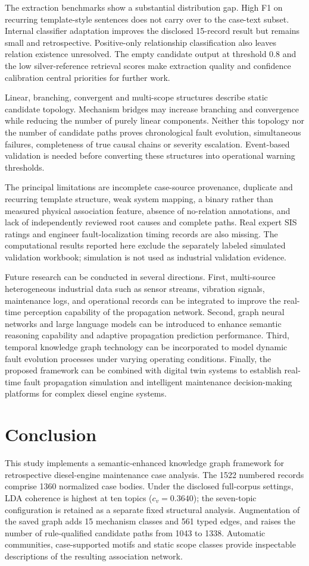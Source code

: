 \documentclass[
aps,%
12pt,%
final,%
notitlepage,%
oneside,%
onecolumn,%
nobibnotes,%
nofootinbib,%
superscriptaddress,%
noshowpacs,%
centertags]%
{revtex4}
\begin{document}
The extraction benchmarks show a substantial distribution gap. High F1 on recurring template-style sentences does not carry over to the case-text subset. Internal classifier adaptation improves the disclosed 15-record result but remains small and retrospective. Positive-only relationship classification also leaves relation existence unresolved. The empty candidate output at threshold 0.8 and the low silver-reference retrieval scores make extraction quality and confidence calibration central priorities for further work.

Linear, branching, convergent and multi-scope structures describe static candidate topology. Mechanism bridges may increase branching and convergence while reducing the number of purely linear components. Neither this topology nor the number of candidate paths proves chronological fault evolution, simultaneous failures, completeness of true causal chains or severity escalation. Event-based validation is needed before converting these structures into operational warning thresholds.

The principal limitations are incomplete case-source provenance, duplicate and recurring template structure, weak system mapping, a binary rather than measured physical association feature, absence of no-relation annotations, and lack of independently reviewed root causes and complete paths. Real expert SIS ratings and engineer fault-localization timing records are also missing. The computational results reported here exclude the separately labeled simulated validation workbook; simulation is not used as industrial validation evidence.

Future research can be conducted in several directions. First, multi-source heterogeneous industrial data such as sensor streams, vibration signals, maintenance logs, and operational records can be integrated to improve the real-time perception capability of the propagation network. Second, graph neural networks and large language models can be introduced to enhance semantic reasoning capability and adaptive propagation prediction performance. Third, temporal knowledge graph technology can be incorporated to model dynamic fault evolution processes under varying operating conditions. Finally, the proposed framework can be combined with digital twin systems to establish real-time fault propagation simulation and intelligent maintenance decision-making platforms for complex diesel engine systems.
\section{Conclusion}
This study implements a semantic-enhanced knowledge graph framework for retrospective diesel-engine maintenance case analysis. The 1522 numbered records comprise 1360 normalized case bodies. Under the disclosed full-corpus settings, LDA coherence is highest at ten topics ($c_v=0.3640$); the seven-topic configuration is retained as a separate fixed structural analysis. Augmentation of the saved graph adds 15 mechanism classes and 561 typed edges, and raises the number of rule-qualified candidate paths from 1043 to 1338. Automatic communities, case-supported motifs and static scope classes provide inspectable descriptions of the resulting association network.
\end{document}
